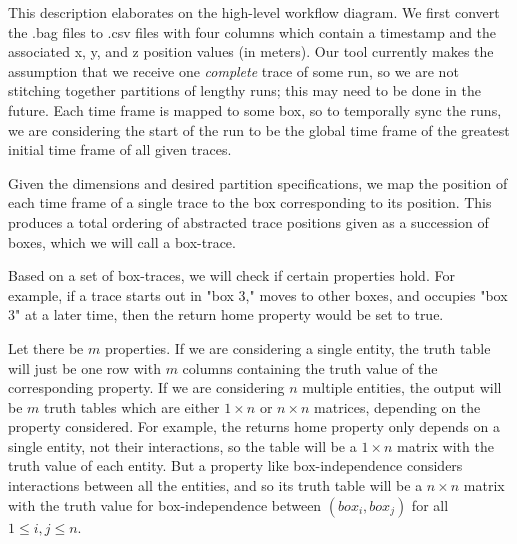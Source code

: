  This description elaborates on the high-level workflow diagram.
 We first convert the .bag files to .csv files with four columns which contain a timestamp and the associated x, y, and z position values (in meters).  
 Our tool currently makes the assumption that we receive one \emph{complete} trace of some run, so we are not stitching together partitions of lengthy runs; this may need to be done in the future.
 Each time frame is mapped to some box, so to temporally sync the runs, we are considering the start of the run to be the global time frame of the greatest initial time frame of all given traces.
 
 Given the dimensions and desired partition specifications, we map the position of each time frame of a single trace to the box corresponding to its position.
 This produces a total ordering of abstracted trace positions given as a succession of boxes, which we will call a box-trace.
 
 Based on a set of box-traces, we will check if certain properties hold.
 For example, if a trace starts out in "box 3," moves to other boxes, and occupies "box 3" at a later time, then the return home property would be set to true.
 
 Let there be $m$ properties.
 If we are considering a single entity, the truth table will just be one row with $m$ columns containing the truth value of the corresponding property.
 If we are considering $n$ multiple entities, the output will be $m$ truth tables which are either $1 \times n$ or $n \times n$ matrices, depending on the property considered.
 For example, the returns home property only depends on a single entity, not their interactions, so the table will be a $1 \times n$ matrix with the truth value of each entity.
 But a property like box-independence considers interactions between all the entities, and so its truth table will be a $n \times n$ matrix with the truth value for box-independence between $(box_i,box_j)$ for all $1 \leq i,j \leq n$.
